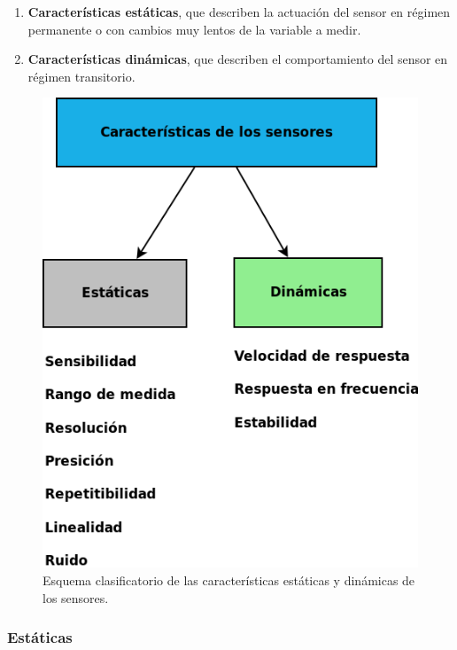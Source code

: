 \begin{enumerate}
 \item \textbf{Características estáticas}, que describen la actuación del sensor en régimen permanente o 
con cambios muy lentos de la variable a medir. \\
 \item \textbf{Características dinámicas}, que describen el comportamiento del sensor en régimen transitorio.\\
\end{enumerate}


\begin{figure}[H]
  \begin{center}
    \includegraphics[scale=0.4]{diagramas/sensores_propiedades.png}
  \end{center}
  \label{fig:telemetria}
 \caption{Esquema clasificatorio de las características estáticas y dinámicas de los sensores.}
\end{figure}


\subsubsection{Estáticas}


